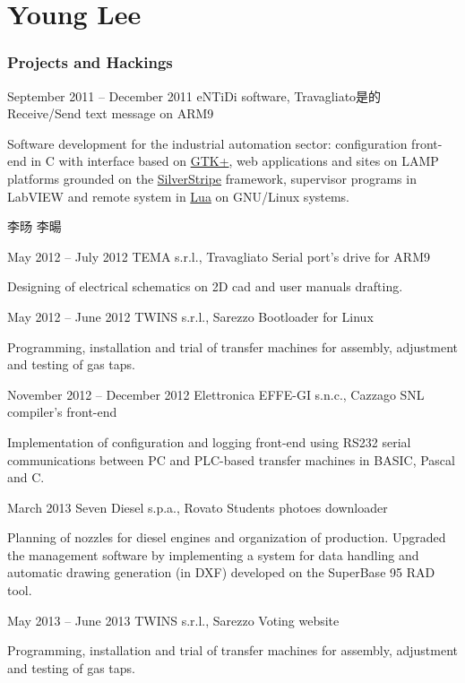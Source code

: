 \documentclass{tccv}
\begin{document}
\part{Young Lee}

\section{Projects and Hackings}

\begin{eventlist}


\begin{CJK}{UTF8}{gbsn}    
\item{September 2011 -- December 2011}
  {eNTiDi software, Travagliato是的}
  {Receive/Send text message on ARM9}

  Software development for the industrial automation sector: configuration
  front-end in C with interface based on \href{http://www.gtk.org/}{GTK+},
  web applications and sites on LAMP platforms grounded on the
  \href{http://www.silverstripe.org/}{SilverStripe} framework,
  supervisor programs in LabVIEW and remote system in
  \href{http://www.lua.org/}{Lua} on GNU/Linux systems.

    李旸
    李暘
\end{CJK}

\item{May 2012 -- July 2012}
  {TEMA s.r.l., Travagliato}
  {Serial port's drive for ARM9}

  Designing of electrical schematics on
  2D cad and user manuals drafting.

\item{May 2012 -- June 2012}
  {TWINS s.r.l., Sarezzo}
  {Bootloader for Linux}

  Programming, installation and trial of transfer machines for assembly,
  adjustment and testing of gas taps. 

\item{November 2012 -- December 2012}
  {Elettronica EFFE-GI s.n.c., Cazzago}
  {SNL compiler's front-end}

  Implementation of configuration and logging front-end using
  RS232 serial communications between PC and PLC-based transfer machines
  in BASIC, Pascal and C.

\item{March 2013}
  {Seven Diesel s.p.a., Rovato}
  {Students photoes downloader}

  Planning of nozzles for diesel engines and organization of production.
  Upgraded the management software by implementing a system for data
  handling and automatic drawing generation (in DXF) developed on the
  SuperBase 95 RAD tool.

\item{May 2013 -- June 2013}
  {TWINS s.r.l., Sarezzo}
  {Voting website}

  Programming, installation and trial of transfer machines for assembly,
  adjustment and testing of gas taps. 

\end{eventlist}
\end{document}
